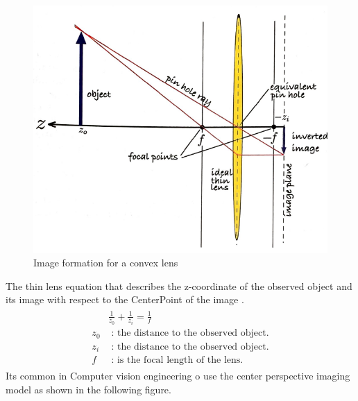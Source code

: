 \documentclass[journal,final,a4paper,twoside]{PS}
\begin{document}
\begin{figure}[h]
\begin{center}
\includegraphics[scale=0.6]{./pics/imageFormationGeometry.png}
\caption{Image formation for a convex lens \cite{Corke}}
\label{fig:imageGeometry}
\end{center}
\end{figure}
The thin lens equation that describes the z-coordinate of the observed object and its image with respect to the CenterPoint of the image \cite{Corke}.
\begin{align}\begin{split}
&\frac{1}{z_0}+\frac{1}{z_i}=\frac{1}{f}\\
z_0&\text{ : the distance to the observed object.}\\
z_i&\text{ : the distance to the observed object.}\\
f&\text{ : is the focal length of the lens.}\end{split}
\end{align}
Its common in Computer vision engineering o use the center perspective imaging model  as shown in the following figure.
\\
\end{document}
